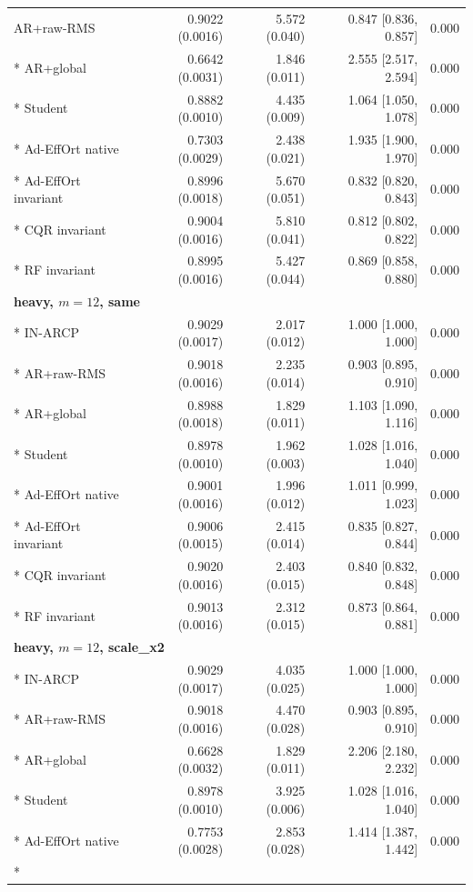 \begin{longtable}{lrrrr}
AR+raw-RMS & 0.9022 (0.0016) & 5.572 (0.040) & 0.847 [0.836, 0.857] & 0.000 \\*
AR+global & 0.6642 (0.0031) & 1.846 (0.011) & 2.555 [2.517, 2.594] & 0.000 \\*
Student & 0.8882 (0.0010) & 4.435 (0.009) & 1.064 [1.050, 1.078] & 0.000 \\*
Ad-EffOrt native & 0.7303 (0.0029) & 2.438 (0.021) & 1.935 [1.900, 1.970] & 0.000 \\*
Ad-EffOrt invariant & 0.8996 (0.0018) & 5.670 (0.051) & 0.832 [0.820, 0.843] & 0.000 \\*
CQR invariant & 0.9004 (0.0016) & 5.810 (0.041) & 0.812 [0.802, 0.822] & 0.000 \\*
RF invariant & 0.8995 (0.0016) & 5.427 (0.044) & 0.869 [0.858, 0.880] & 0.000 \\
\midrule
\multicolumn{5}{l}{\textbf{heavy, $m=12$, same}}\\*
IN-ARCP & 0.9029 (0.0017) & 2.017 (0.012) & 1.000 [1.000, 1.000] & 0.000 \\*
AR+raw-RMS & 0.9018 (0.0016) & 2.235 (0.014) & 0.903 [0.895, 0.910] & 0.000 \\*
AR+global & 0.8988 (0.0018) & 1.829 (0.011) & 1.103 [1.090, 1.116] & 0.000 \\*
Student & 0.8978 (0.0010) & 1.962 (0.003) & 1.028 [1.016, 1.040] & 0.000 \\*
Ad-EffOrt native & 0.9001 (0.0016) & 1.996 (0.012) & 1.011 [0.999, 1.023] & 0.000 \\*
Ad-EffOrt invariant & 0.9006 (0.0015) & 2.415 (0.014) & 0.835 [0.827, 0.844] & 0.000 \\*
CQR invariant & 0.9020 (0.0016) & 2.403 (0.015) & 0.840 [0.832, 0.848] & 0.000 \\*
RF invariant & 0.9013 (0.0016) & 2.312 (0.015) & 0.873 [0.864, 0.881] & 0.000 \\
\midrule
\multicolumn{5}{l}{\textbf{heavy, $m=12$, scale\_x2}}\\*
IN-ARCP & 0.9029 (0.0017) & 4.035 (0.025) & 1.000 [1.000, 1.000] & 0.000 \\*
AR+raw-RMS & 0.9018 (0.0016) & 4.470 (0.028) & 0.903 [0.895, 0.910] & 0.000 \\*
AR+global & 0.6628 (0.0032) & 1.829 (0.011) & 2.206 [2.180, 2.232] & 0.000 \\*
Student & 0.8978 (0.0010) & 3.925 (0.006) & 1.028 [1.016, 1.040] & 0.000 \\*
Ad-EffOrt native & 0.7753 (0.0028) & 2.853 (0.028) & 1.414 [1.387, 1.442] & 0.000 \\*

\end{longtable}
